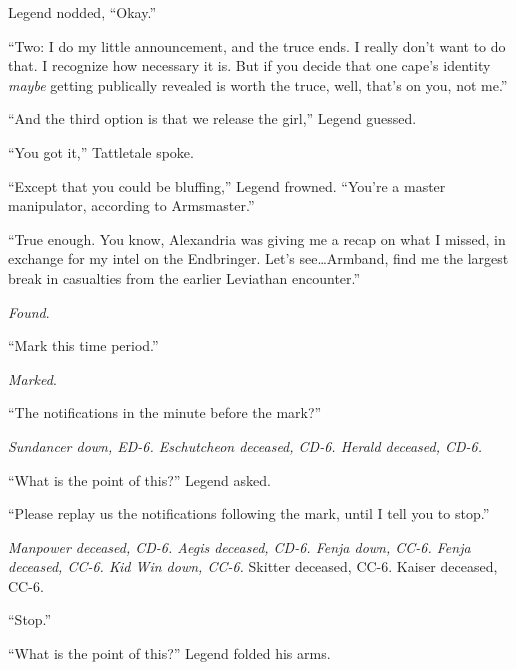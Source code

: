 Legend nodded, ``Okay.''



``Two: I do my little announcement, and the truce ends.  I really don't want to do that.  I recognize how necessary it is.  But if you decide that one cape's identity \emph{maybe} getting publically revealed is worth the truce, well, that's on you, not me.''



``And the third option is that we release the girl,'' Legend guessed.



``You got it,'' Tattletale spoke.



``Except that you could be bluffing,'' Legend frowned.  ``You're a master manipulator, according to Armsmaster.''



``True enough.  You know, Alexandria was giving me a recap on what I missed, in exchange for my intel on the Endbringer.  Let's see\ldots Armband, find me the largest break in casualties from the earlier Leviathan encounter.''



\emph{Found}.



``Mark this time period.''



\emph{Marked}.



``The notifications in the minute before the mark?''



\emph{Sundancer down, ED-6.  Eschutcheon deceased, CD-6.  Herald deceased, CD-6.}



``What is the point of this?'' Legend asked.



``Please replay us the notifications following the mark, until I tell you to stop.''



\emph{Manpower deceased, CD-6.  Aegis deceased, CD-6.  Fenja down, CC-6.  Fenja deceased, CC-6.  Kid Win down, CC-6.  }Skitter deceased, CC-6. Kaiser deceased, CC-6.



``Stop.''



``What is the point of this?''  Legend folded his arms.



